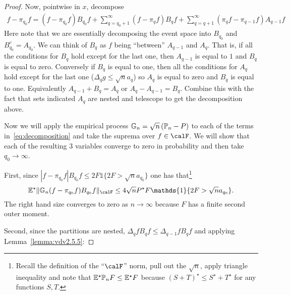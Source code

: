 \begin{proof}
	Now, pointwise in \(x\), decompose
	\begin{align}
		\label{eq:decomposition}
		\tag{B-1}
		f - \pi_{q_0}f = (f-\pi_{q_0}f)B_{q_0}f + \sum_{q= q_0+1}^\infty (f-\pi_qf)B_qf + \sum_{q=q+1}^\infty (\pi_qf-\pi_{q-1}f)A_{q-1}f  
	\end{align}
	Here note that we are essentially decomposing the event space into \(B_{q_0}\) and \(B_{q_0}^c = A_{q_0}\). We can think of \(B_q\) as \(f\) being ``between'' \(A_{q-1}\) and \(A_{q}\). That is, if all the conditions for \(B_q\) hold except for the last one, then \(A_{q-1}\) is equal to \(1\) and \(B_q\) is equal to zero. Conversely if \(B_q\) is equal to one, then all the conditions for \(A_q\) hold except for the last one (\(\Delta_q g \leq \sqrt{n} a_{q}\)) so \(A_q\) is equal to zero and \(B_q\) is equal to one. Equivalently \(A_{q-1} + B_q = A_q\) or \(A_q - A_{q-1} = B_q\). Combine this with the fact that sets indicated \(A_q\) are nested and telescope to get the decomposition above.  

	Now we will apply the empirical process \(\mathbb{G}_n = \sqrt{n}\left(\P_n-P\right)\) to each of the terms in~\eqref{eq:decomposition} and take the suprema over \(f\in\calF\). We will show that each of the resulting 3 variables converge to zero in probability and then take \(q_0 \to \infty\).

	First, since \(|f-\pi_{q_0}f|B_{q_0}f \leq 2F\mathds{1}\{2F > \sqrt{n}a_{q_0}\}\) one has that\footnote{Recall the definition of the ``\(\calF\)'' norm, pull out the \(\sqrt{n}\), apply triangle inequality and note that \(\E^\star\P_n F \leq \E^\star F\) because \((S+ T)^\star \leq S^\star + T^\star\) for any functions \(S,T\). } 
	\[
		\E^\star\|\mathbb{G}_n(f-\pi_{q_0}f)B_{q_0}f\|_\calF \leq 4\sqrt{n}P^\star F\mathds{1}\{2F > \sqrt{n}a_{q_0}\} 
	.\] 
	The right hand size converges to zero as \(n\to\infty\) because \(F\) has a finite second outer moment.

	Second, since the partitions are nested, \(\Delta_q f B_q f \leq  \Delta_{q-1}fB_qf\) and applying Lemma~\ref{lemma:vdv2.5.5}:



\end{proof}

